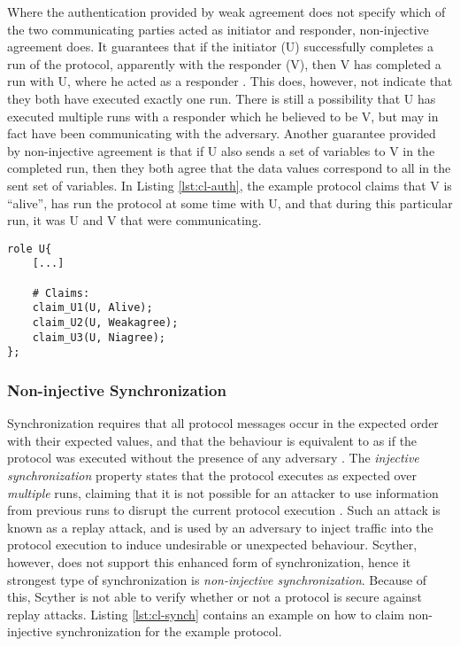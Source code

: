 Where the authentication provided by weak agreement does not specify which of the two communicating parties acted as initiator and responder, non-injective agreement does. It guarantees that if the initiator (U) successfully completes a run of the protocol, apparently with the responder (V), then V has completed a run with U, where he acted as a responder \cite{lowe1997hierarchy}. This does, however, not indicate that they both have executed exactly one run. There is still a possibility that U has executed multiple runs with a responder which he believed to be V, but may in fact have been communicating with the adversary. Another guarantee provided by non-injective agreement is that if U also sends a set of variables to V in the completed run, then they both agree that the data values correspond to all in the sent set of variables. In Listing \ref{lst:cl-auth}, the example protocol claims that V is ``alive'', has run the protocol at some time with U, and that during this particular run, it was U and V that were communicating.\newline

\begin{lstlisting}[caption={Example of how to claim authentication by use of alive, weak-agreement, and non-injective agreement.}, label={lst:cl-auth}]
role U{
	[...]
	
	# Claims:
	claim_U1(U, Alive);
	claim_U2(U, Weakagree);
	claim_U3(U, Niagree);
};
\end{lstlisting} 


\subsubsection{Non-injective Synchronization}

Synchronization requires that all protocol messages occur in the expected order with their expected values, and that the behaviour is equivalent to as if the protocol was executed without the presence of any adversary \cite{cremers2006injective}. The \emph{injective synchronization} property states that the protocol executes as expected over \emph{multiple} runs, claiming that it is not possible for an attacker to use information from previous runs to disrupt the current protocol execution \cite{cremers2005operational}. Such an attack is known as a replay attack, and is used by an adversary to inject traffic into the protocol execution to induce undesirable or unexpected behaviour. Scyther, however, does not support this enhanced form of synchronization, hence it strongest type of synchronization is \emph{non-injective synchronization}. Because of this, Scyther is not able to verify whether or not a protocol is secure against replay attacks. Listing \ref{lst:cl-synch} contains an example on how to claim non-injective synchronization for the example protocol.\newline

